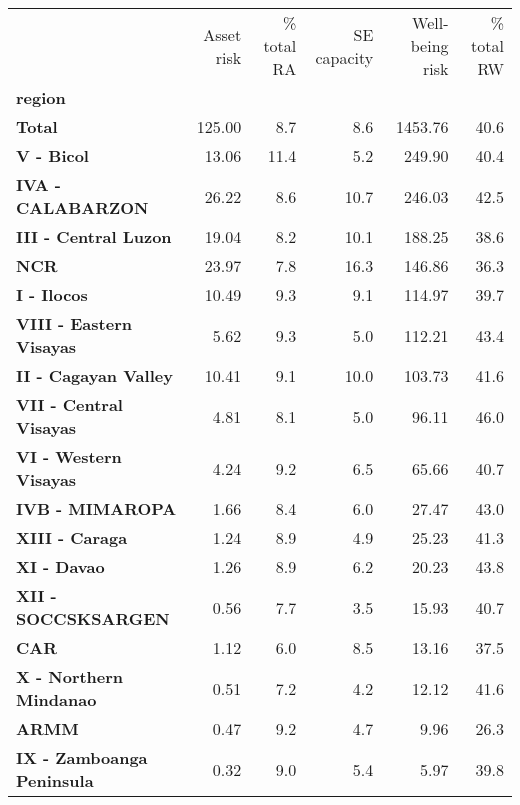\begin{tabular}{lrrrrr}
\toprule
{} &  Asset risk &  \% total RA &  SE capacity &  Well-being risk &  \% total RW \\
\textbf{region                  } &             &             &              &                  &             \\
\midrule
\textbf{Total                   } &      125.00 &         8.7 &          8.6 &          1453.76 &        40.6 \\
\textbf{V - Bicol               } &       13.06 &        11.4 &          5.2 &           249.90 &        40.4 \\
\textbf{IVA - CALABARZON        } &       26.22 &         8.6 &         10.7 &           246.03 &        42.5 \\
\textbf{III - Central Luzon     } &       19.04 &         8.2 &         10.1 &           188.25 &        38.6 \\
\textbf{NCR                     } &       23.97 &         7.8 &         16.3 &           146.86 &        36.3 \\
\textbf{I - Ilocos              } &       10.49 &         9.3 &          9.1 &           114.97 &        39.7 \\
\textbf{VIII - Eastern Visayas  } &        5.62 &         9.3 &          5.0 &           112.21 &        43.4 \\
\textbf{II - Cagayan Valley     } &       10.41 &         9.1 &         10.0 &           103.73 &        41.6 \\
\textbf{VII - Central Visayas   } &        4.81 &         8.1 &          5.0 &            96.11 &        46.0 \\
\textbf{VI - Western Visayas    } &        4.24 &         9.2 &          6.5 &            65.66 &        40.7 \\
\textbf{IVB - MIMAROPA          } &        1.66 &         8.4 &          6.0 &            27.47 &        43.0 \\
\textbf{XIII - Caraga           } &        1.24 &         8.9 &          4.9 &            25.23 &        41.3 \\
\textbf{XI - Davao              } &        1.26 &         8.9 &          6.2 &            20.23 &        43.8 \\
\textbf{XII - SOCCSKSARGEN      } &        0.56 &         7.7 &          3.5 &            15.93 &        40.7 \\
\textbf{CAR                     } &        1.12 &         6.0 &          8.5 &            13.16 &        37.5 \\
\textbf{X - Northern Mindanao   } &        0.51 &         7.2 &          4.2 &            12.12 &        41.6 \\
\textbf{ARMM                    } &        0.47 &         9.2 &          4.7 &             9.96 &        26.3 \\
\textbf{IX - Zamboanga Peninsula} &        0.32 &         9.0 &          5.4 &             5.97 &        39.8 \\
\bottomrule
\end{tabular}
